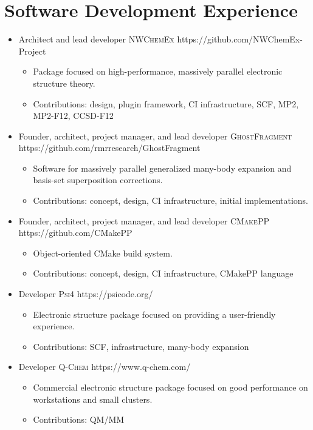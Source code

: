 \documentclass[11pt,a4paper,sans]{moderncv}
\begin{document}
\section{Software Development Experience}
\begin{itemize}
	\item{
		{Architect and lead developer}
		{\textsc{NWChemEx}}
		{https://github.com/NWChemEx-Project}
		{}
		{\begin{itemize}
			\item{Package focused on high-performance, massively parallel
			      electronic structure theory.}
		    \item{Contributions: design, plugin framework, CI infrastructure,
		    	  SCF, MP2, MP2-F12, CCSD-F12}
		\end{itemize}}}
	\item{
          {Founder, architect, project manager, and lead developer}
          {\textsc{GhostFragment}}
          {https://github.com/rmrresearch/GhostFragment}
          {}
          {\begin{itemize}
          		\item{Software for massively parallel generalized many-body
          			  expansion and basis-set superposition corrections.}
                \item{Contributions: concept, design, CI infrastructure,
                	 initial implementations.}
                 \end{itemize}}}
	\item{
		  {Founder, architect, project manager, and lead developer}
		  {\textsc{CMakePP}}
		  {https://github.com/CMakePP}
		  {}
		  {\begin{itemize}
		  		\item{Object-oriented CMake build system.}
	 		    \item{Contributions: concept, design, CI infrastructure, CMakePP
		   	          language}
 	       \end{itemize}}}
	\item{
		  {Developer}
		  {\textsc{Psi4}}
		  {https://psicode.org/}
		  {}
		  {\begin{itemize}
		  		\item{Electronic structure package focused on providing a
		  			  user-friendly experience.}
			  	\item{Contributions: SCF, infrastructure, many-body expansion}
		  	\end{itemize}}}
	\item{
		  {Developer}
		  {\textsc{Q-Chem}}
		  {https://www.q-chem.com/}
		  {}
		  {\begin{itemize}
		  		\item{Commercial electronic structure package focused on good
		  			  performance on workstations and small clusters.}
		 	    \item{Contributions: QM/MM}
		   \end{itemize}}}
\end{itemize}
\end{document}
